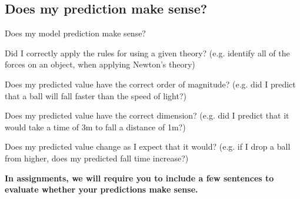 \documentclass[aspectratio=169,
hyperref={colorlinks,urlcolor=blue}
]{beamer}
\begin{document}
\subsection{Does my prediction make sense?}
\label{subsec:doesmypredictionmakesense}
\begin{bulletframe}{Does my model prediction make sense?}
\item Did I correctly apply the rules for using a given theory? (e.g. identify all of the forces on an object, when applying Newton’s theory)
\item Does my predicted value have the correct order of magnitude? (e.g. did I predict that a ball will fall faster than the speed of light?)
\item Does my predicted value have the correct dimension? (e.g. did I predict that it would take a time of 3m to fall a distance of 1m?)
\item Does my predicted value change as I expect that it would? (e.g. if I drop a ball from higher, does my predicted fall time increase?)
\item[$\rightarrow$] \textbf{In assignments, we will require you to include a few sentences to evaluate whether your predictions make sense.}
\end{bulletframe}


\end{document}
